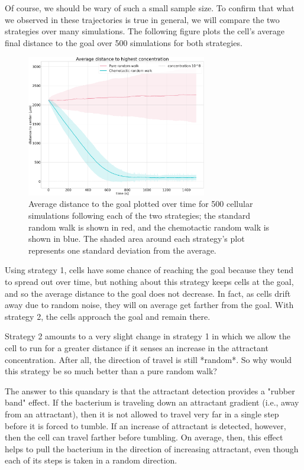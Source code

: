 Of course, we should be wary of such a small sample size. To confirm that what we observed in these trajectories is true in general, we will compare the two strategies over many simulations. The following figure plots the cell's average final distance to the goal over 500 simulations for both strategies.

\begin{figure}[h]
\centering
\mySfFamily
\includegraphics[width = 0.7\textwidth]{../images/chemotaxis_performance_compare_uniform.png}
\caption{Average distance to the goal plotted over time for 500 cellular simulations following each of the two strategies; the standard random walk is shown in red, and the chemotactic random walk is shown in blue. The shaded area around each strategy's plot represents one standard deviation from the average.}
\label{fig:chemotaxis_performance_compare_uniform}
\end{figure}


Using strategy 1, cells have some chance of reaching the goal because they tend to spread out over time, but nothing about this strategy keeps cells at the goal, and so the average distance to the goal does not decrease. In fact, as cells drift away due to random noise, they will on average get farther from the goal. With strategy 2, the cells approach the goal and remain there.

Strategy 2 amounts to a very slight change in strategy 1 in which we allow the cell to run for a greater distance if it senses an increase in the attractant concentration. After all, the direction of travel is still *random*. So why would this strategy be so much better than a pure random walk?

The answer to this quandary is that the attractant detection provides a "rubber band" effect. If the bacterium is traveling down an attractant gradient (i.e., away from an attractant), then it is not allowed to travel very far in a single step before it is forced to tumble. If an increase of attractant is detected, however, then the cell can travel farther before tumbling. On average, then, this effect helps to pull the bacterium in the direction of increasing attractant, even though each of its steps is taken in a random direction.

